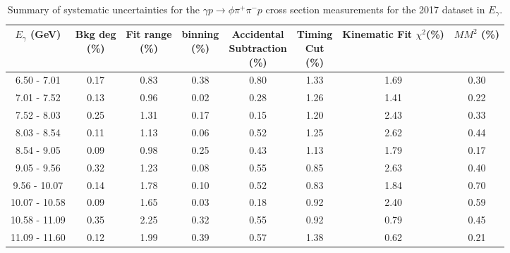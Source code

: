 \begin{center}
\null
\vfill
\begin{table}[!htbp]
    \small
    \centering
    \caption{Summary of systematic uncertainties for the $\gamma p \rightarrow \phi \pi^{+} \pi^{-} p$ cross section measurements for the 2017 dataset in $E_{\gamma}$.}
    \label{tab.y2175.syserr.phi2pi.2.1}
    \begin{tabular}{|c|c|c|c|c|c|c|c|}
        \hline
        $E_{\gamma}$ (GeV)&\thead{Bkg deg\\(\%)}&\thead{Fit range\\(\%)}&\thead{binning\\(\%)}&\thead{Accidental\\Subtraction\\(\%)}&\thead{Timing\\Cut\\(\%)}&\thead{Kinematic\\Fit $\chi^{2}$(\%)}&\thead{$MM^{2}$\\(\%)}\\
        \hline
        6.50 - 7.01 & 0.17 & 0.83 & 0.38 & 0.80 & 1.33 & 1.69 & 0.30 \\ 
        7.01 - 7.52 & 0.13 & 0.96 & 0.02 & 0.28 & 1.26 & 1.41 & 0.22 \\ 
        7.52 - 8.03 & 0.25 & 1.31 & 0.17 & 0.15 & 1.20 & 2.43 & 0.33 \\ 
        8.03 - 8.54 & 0.11 & 1.13 & 0.06 & 0.52 & 1.25 & 2.62 & 0.44 \\ 
        8.54 - 9.05 & 0.09 & 0.98 & 0.25 & 0.43 & 1.13 & 1.79 & 0.17 \\ 
        9.05 - 9.56 & 0.32 & 1.23 & 0.08 & 0.55 & 0.85 & 2.63 & 0.40 \\ 
        9.56 - 10.07 & 0.14 & 1.78 & 0.10 & 0.52 & 0.83 & 1.84 & 0.70 \\ 
        10.07 - 10.58 & 0.09 & 1.65 & 0.03 & 0.18 & 0.92 & 2.40 & 0.59 \\ 
        10.58 - 11.09 & 0.35 & 2.25 & 0.32 & 0.55 & 0.92 & 0.79 & 0.45 \\ 
        11.09 - 11.60 & 0.12 & 1.99 & 0.39 & 0.57 & 1.38 & 0.62 & 0.21 \\
        \hline
    \end{tabular}
\end{table}
\end{center}

